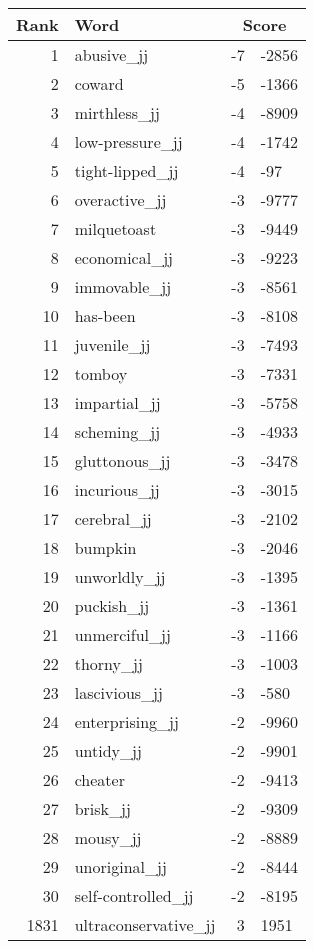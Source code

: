 \begin{longtable}[!htbp]{| rlr@{.}l |}
    \hline
    \textbf{Rank} & \textbf{Word} & \multicolumn{2}{c|}{\textbf{Score}} \\
    \hline
    \endhead
    1 & abusive\_jj & -7 & -2856 \\
    2 & coward & -5 & -1366 \\
    3 & mirthless\_jj & -4 & -8909 \\
    4 & low-pressure\_jj & -4 & -1742 \\
    5 & tight-lipped\_jj & -4 & -97 \\
    6 & overactive\_jj & -3 & -9777 \\
    7 & milquetoast & -3 & -9449 \\
    8 & economical\_jj & -3 & -9223 \\
    9 & immovable\_jj & -3 & -8561 \\
    10 & has-been & -3 & -8108 \\
    11 & juvenile\_jj & -3 & -7493 \\
    12 & tomboy & -3 & -7331 \\
    13 & impartial\_jj & -3 & -5758 \\
    14 & scheming\_jj & -3 & -4933 \\
    15 & gluttonous\_jj & -3 & -3478 \\
    16 & incurious\_jj & -3 & -3015 \\
    17 & cerebral\_jj & -3 & -2102 \\
    18 & bumpkin & -3 & -2046 \\
    19 & unworldly\_jj & -3 & -1395 \\
    20 & puckish\_jj & -3 & -1361 \\
    21 & unmerciful\_jj & -3 & -1166 \\
    22 & thorny\_jj & -3 & -1003 \\
    23 & lascivious\_jj & -3 & -580 \\
    24 & enterprising\_jj & -2 & -9960 \\
    25 & untidy\_jj & -2 & -9901 \\
    26 & cheater & -2 & -9413 \\
    27 & brisk\_jj & -2 & -9309 \\
    28 & mousy\_jj & -2 & -8889 \\
    29 & unoriginal\_jj & -2 & -8444 \\
    30 & self-controlled\_jj & -2 & -8195 \\
    1831 & ultraconservative\_jj & 3 & 1951 \\

\end{longtable}
